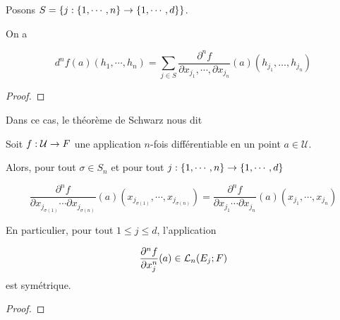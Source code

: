 \begin{proposition}
	Posons $S = \GSset{j : \GSset{1, \cdots, n} \rightarrow \GSset{1, \cdots, d}}$.

	On a

	\begin{equation*}
		d^{n} f(a) (h_{1}, \cdots, h_{n}) = \sum_{j \in S} \frac{\partial^{n} f}{\partial x_{j_{1}}, \cdots, \partial x_{j_{n}}}
		(a) (h_{j_{1}}, \ldots, h_{j_{n}})
	\end{equation*}
\end{proposition}

\ifdefined\outputproof
\begin{proof}

\end{proof}
\fi

Dans ce cas, le théorème de Schwarz nous dit

\begin{theorem}
	\label{theorem:symetry_schwarz_generalized_partial}
	Soit $\GSfunction{f}{\mathcal{U}}{F}$ une application $n$-fois
	différentiable en un point $a \in \mathcal{U}$.

	Alors, pour tout $\sigma \in S_{n}$ et pour tout $j : \GSset{1, \cdots, n}
	\rightarrow \GSset{1, \cdots, d}$

	\begin{equation*}
		\frac{\partial^{n} f}{\partial x_{j_{\sigma(1)}} \cdots \partial
		x_{j_{\sigma(n)}}} (a) (x_{j_{\sigma(1)}}, \cdots, x_{j_{\sigma(n)}}) =
		\frac{\partial^{n} f}{\partial x_{j_{1}} \cdots \partial
		x_{j_{n}}} (a) (x_{j_{1}}, \cdots, x_{j_{n}})
	\end{equation*}

	En particulier, pour tout $1 \leq j \leq d$, l'application

	\begin{equation*}
		\frac{\partial^{n} f}{\partial x_{j}^{n}} (a) \in \GScontinueHomo[n]{E_{j}}{F}
	\end{equation*}
	est symétrique.
\end{theorem}

\ifdefined\outputproof
\begin{proof}

\end{proof}
\fi



